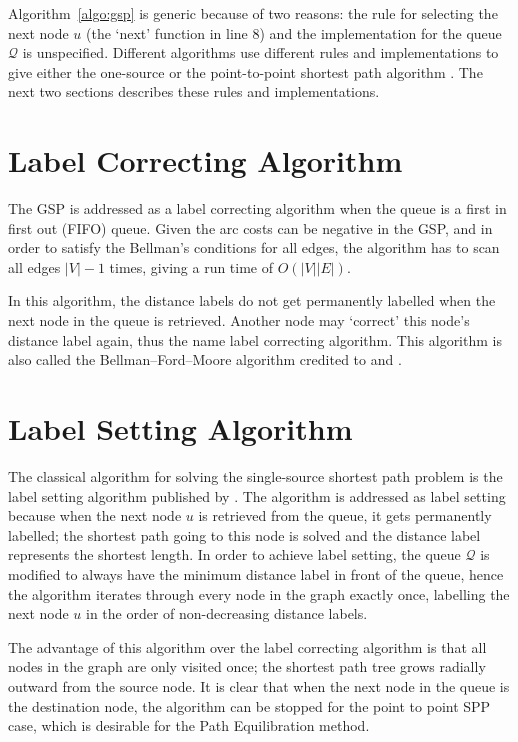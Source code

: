 Algorithm~\ref{algo:gsp} is generic because of two reasons:
the rule for selecting the next node $u$ (the `next' function in line 8) and
the implementation for the queue $\mathcal{Q}$ is unspecified.
Different algorithms use different rules and implementations to give 
either the one-source or the point-to-point shortest path algorithm \citep{mplomer}.
The next two sections describes these rules and implementations.

\section{Label Correcting Algorithm}
\label{section:labelcorrectingalgorithm}
The GSP is addressed as a label correcting algorithm when the queue is a first in first out (FIFO) queue.
Given the arc costs can be negative in the GSP,
and in order to satisfy the Bellman's conditions for all edges,
the algorithm has to scan all edges $|V|-1$ times,
giving a run time of $O(|V||E|)$.

In this algorithm,
the distance labels do not get permanently labelled when the next node in the queue is retrieved.
Another node may `correct' this node's distance label again,
thus the name label correcting algorithm.
This algorithm is also called the Bellman–Ford–Moore algorithm credited to \citet{Bellman, Ford} and \citet{Moore}.

\section{Label Setting Algorithm}
\label{section:labelsettingalgorithm}
The classical algorithm for solving the single-source shortest path problem is the label setting algorithm published by \citet{Dijkstra}.
The algorithm is addressed as label setting because when the next node $u$ is retrieved from the queue,
it gets permanently labelled;
the shortest path going to this node is solved and 
the distance label represents the shortest length.
In order to achieve label setting, 
the queue $\mathcal{Q}$ is modified to always have the minimum distance label in front of the queue,
hence the algorithm iterates through every node in the graph exactly once,
labelling the next node $u$ in the order of non-decreasing distance labels.

The advantage of this algorithm over the label correcting algorithm is
that all nodes in the graph are only visited once;
the shortest path tree grows radially outward from the source node.
It is clear that when the next node in the queue is the destination node,
the algorithm can be stopped for the point to point SPP case,
which is desirable for the Path Equilibration method.

